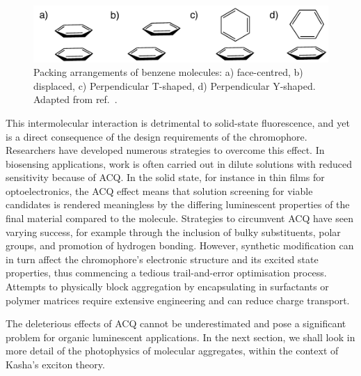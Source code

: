 \begin{figure}[t]
\centering
  \includegraphics[width=0.7\linewidth]{1Intro/Stacking.pdf}
  \caption[Stacking arrangements of benzene]{Packing arrangements of benzene molecules: a) face-centred, b) displaced, c) Perpendicular T-shaped, d) Perpendicular Y-shaped. Adapted from ref.~.}
  \label{figure: Benzene_Stacking}
\end{figure}

This intermolecular interaction is detrimental to solid-state fluorescence, and yet is a direct consequence of the design requirements of the chromophore. Researchers have developed numerous strategies to overcome this effect. In biosensing applications, work is often carried out in dilute solutions with reduced sensitivity because of \ac{ACQ}.\cite{Thomas2007,Kwok2015} In the solid state, for instance in thin films for optoelectronics, the \ac{ACQ} effect means that solution screening for viable candidates is rendered meaningless by the differing luminescent properties of the final material compared to the molecule. Strategies to circumvent \ac{ACQ} have seen varying success, for example through the inclusion of bulky substituents, polar groups, and promotion of hydrogen bonding.\cite{Hong2009,Zhang2013,Mei2014,Mei2015} However, synthetic modification can in turn affect the chromophore's electronic structure and its excited state properties, thus commencing a tedious trail-and-error optimisation process. Attempts to physically block aggregation by encapsulating in surfactants or polymer matrices require extensive engineering and can reduce charge transport.\cite{Hong2009,Chen2000,Lee2013} 

The deleterious effects of \ac{ACQ} cannot be underestimated and pose a significant problem for organic luminescent applications. In the next section, we shall look in more detail of the photophysics of molecular aggregates, within the context of Kasha's exciton theory.

